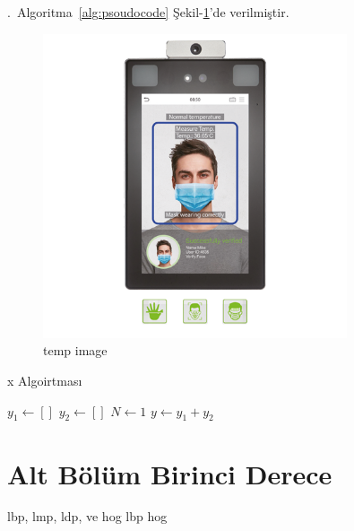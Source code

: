 \lipsum[5] .~Algoritma~\ref{alg:psoudocode} 
\lipsum[8] Şekil-\ref{fig:geofeats}'de verilmiştir.

\begin{figure}[h]
\centering
\includegraphics[trim={0.5cm 0.4cm 0.5cm 2cm},clip,width=0.80\textwidth]{gorseller/temp_image.png}
\caption{temp image}\label{fig:geofeats}
\end{figure}


{}
\vspace{0cm}
\begin{algorithm}[htp]
\caption{x Algoirtması}\label{alg:psoudocode}
$y_{1} \gets [ ]$\;
$y_{2} \gets [ ]$\;
$N \gets 1$\;
$y \gets y_{1} + y_{2} $
\end{algorithm}


\newpage
\section{Alt Bölüm Birinci Derece}

\lipsum[8] \acrfull{lbp}, \acrfull{lmp}, \acrfull{ldp}, ve \acrfull{hog} 
\lipsum[6]
\acrshort{lbp}  \acrshort{hog} 

